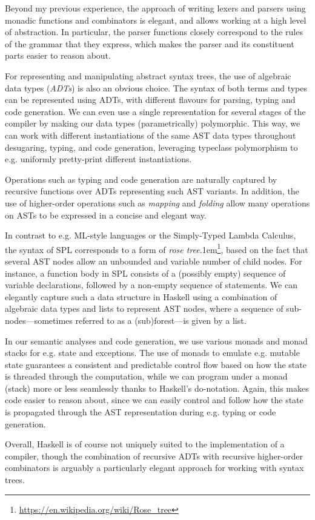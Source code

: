 Beyond my previous experience, the approach of writing lexers and parsers using
monadic functions and combinators is elegant, and allows working at a high level
of abstraction. In particular, the parser functions closely correspond to the
rules of the grammar that they express, which makes the parser and its
constituent parts easier to reason about.

For representing and manipulating abstract syntax trees, the use of algebraic
data types (\emph{ADTs}) is also an obvious choice. The syntax of both terms and
types can be represented using ADTs, with different flavours for parsing, typing
and code generation.
We can even use a single representation for several stages of the compiler by
making our data types (parametrically) polymorphic. This way, we can work with
different instantiations of the same AST data types throughout desugaring,
typing, and code generation, leveraging typeclass polymorphism to e.g.
uniformly pretty-print different instantiations.

Operations such as typing and code generation are naturally captured by
recursive functions over ADTs representing such AST variants. In addition, the
use of higher-order operations such as \emph{mapping} and \emph{folding} allow
many operations on ASTs to be expressed in a concise and elegant way.

In contrast to e.g. ML-style languages or the Simply-Typed Lambda Calculus, the
syntax of SPL corresponds to a form of
\emph{rose tree}\kern.1em\footnote{\url{https://en.wikipedia.org/wiki/Rose_tree}},
based on the fact that several AST nodes allow an unbounded and variable number
of child nodes.
For instance, a function body in SPL consists of a (possibly empty) sequence of
variable declarations, followed by a non-empty sequence of statements.
We can elegantly capture such a data structure in Haskell using a combination of
algebraic data types and lists to represent AST nodes, where a sequence of
sub-nodes---sometimes referred to as a (sub)forest---is given by a list.

In our semantic analyses and code generation, we use various monads and monad
stacks for e.g. state and exceptions.
The use of monads to emulate e.g. mutable state guarantees a consistent and
predictable control flow based on how the state is threaded through the
computation, while we can program under a monad (stack) more or less seamlessly
thanks to Haskell's do-notation.
Again, this makes code easier to reason about, since we can easily control and
follow how the state is propagated through the AST representation during e.g.
typing or code generation.

Overall, Haskell is of course not uniquely suited to the implementation of a
compiler, though the combination of recursive ADTs with recursive higher-order
combinators is arguably a particularly elegant approach for working with syntax
trees.

